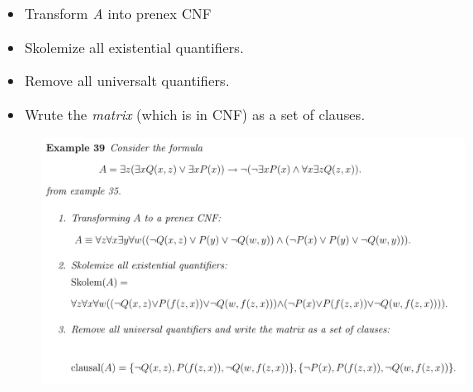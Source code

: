 \documentclass[10pt,a4paper]{article}
\begin{document}
\begin{itemize}
\item Transform \textit{A} into prenex CNF
\item Skolemize all existential quantifiers.
\item Remove all universalt quantifiers.
\item Wrute the \textit{matrix} (which is in CNF) as a set of clauses.
\end{itemize}

\begin{figure}[H]
\includegraphics[scale=0.6]{./figures/clausalex.pdf}
\end{figure}
\end{document}
